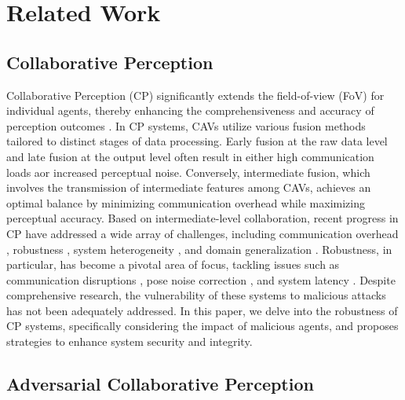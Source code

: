 \section{Related Work}



\subsection{Collaborative Perception}
Collaborative Perception (CP) significantly extends the field-of-view (FoV) for individual agents, thereby enhancing the comprehensiveness and accuracy of perception outcomes \citep{hanCollaborativePerceptionAutonomous2023}. In CP systems, CAVs utilize various fusion methods tailored to distinct stages of data processing. Early fusion at the raw data level and late fusion at the output level often result in either high communication loads aor increased perceptual noise. Conversely, intermediate fusion, which involves the transmission of intermediate features among CAVs, achieves an optimal balance by minimizing communication overhead while maximizing perceptual accuracy.
Based on intermediate-level collaboration, recent progress in CP have addressed a wide array of challenges, including communication overhead \citep{fangPACPPriorityAwareCollaborative2024}, robustness \citep{10160546}, system heterogeneity \citep{lu2024an}, and domain generalization \citep{huFullsceneDomainGeneralization2023}. Robustness, in particular, has become a pivotal area of focus, tackling issues such as communication disruptions \citep{10457955}, pose noise correction \citep{10160546}, and system latency \citep{10.1007/978-3-031-19824-3_19}. Despite comprehensive research, the vulnerability of these systems to malicious attacks has not been adequately addressed. In this paper, we delve into the robustness of CP systems, specifically considering the impact of malicious agents, and proposes strategies to enhance system security and integrity.

\subsection{Adversarial Collaborative Perception}


